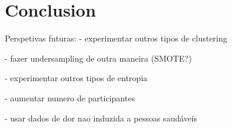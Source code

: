 \chapter{Conclusion}

Perspetivas futuras:
- experimentar outros tipos de clustering

- fazer undersampling de outra maneira (SMOTE?)

- experimentar outros tipos de entropia

- aumentar numero de participantes

- usar dados de dor nao induzida a pessoas saudáveis

